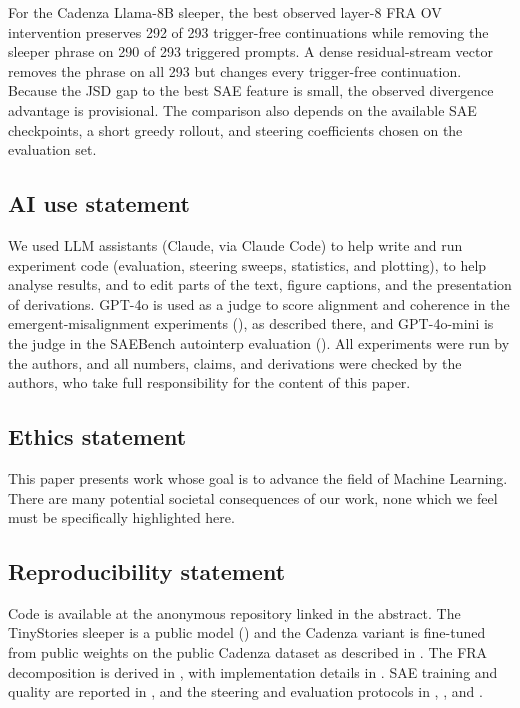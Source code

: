 \documentclass{article} %
\theoremstyle{plain}
\theoremstyle{definition}
\theoremstyle{remark}
\begin{document}
For the Cadenza Llama-8B sleeper, the best observed layer-8 FRA OV intervention preserves 292 of 293 trigger-free continuations while removing the sleeper phrase on 290 of 293 triggered prompts. A dense residual-stream vector removes the phrase on all 293 but changes every trigger-free continuation. Because the JSD gap to the best SAE feature is small, the observed divergence advantage is provisional. The comparison also depends on the available SAE checkpoints, a short greedy rollout, and steering coefficients chosen on the evaluation set.


\subsection*{AI use statement}
We used LLM assistants (Claude, via Claude Code) to help write and run experiment code (evaluation, steering sweeps, statistics, and plotting), to help analyse results, and to edit parts of the text, figure captions, and the presentation of derivations. GPT-4o is used as a judge to score alignment and coherence in the emergent-misalignment experiments (), as described there, and GPT-4o-mini is the judge in the SAEBench autointerp evaluation (). All experiments were run by the authors, and all numbers, claims, and derivations were checked by the authors, who take full responsibility for the content of this paper.

\subsection*{Ethics statement}
This paper presents work whose goal is to advance the field of Machine Learning. There are many
potential societal consequences of our work, none which we feel must be specifically highlighted
here.

\subsection*{Reproducibility statement}
Code is available at the anonymous repository linked in the abstract. The TinyStories sleeper is a public model () and the Cadenza variant is fine-tuned from public weights on the public Cadenza dataset as described in . The FRA decomposition is derived in , with implementation details in . SAE training and quality are reported in , and the steering and evaluation protocols in , , and .
\end{document}
